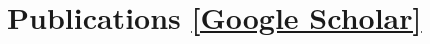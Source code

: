 \documentclass[10pt, letterpaper]{article}
\makeatletter
\newcommand{\resumeProjectHeading}[2]{
    \item
    \begin{tabular*}{0.97\textwidth}{l@{\extracolsep{\fill}}r}
      \small#1 & #2 \\
    \end{tabular*}\vspace{-7pt}
}
\newcommand{\resumeSubHeadingListStart}{\begin{itemize}[leftmargin=0.10in, label={}]}
\makeatother
\begin{document}
\section{Publications \hfill \normalsize{\textnormal{\scholarstats} \href{https://scholar.google.com/citations?user=UDxK99QAAAAJ&hl=en}{\textnormal{\underline{[Google Scholar]}}}}}









   

    





\end{document}
